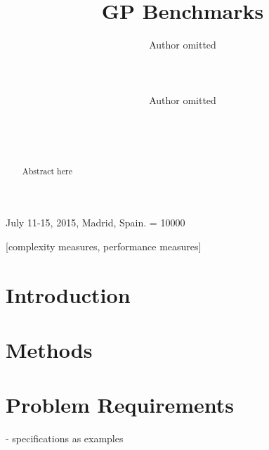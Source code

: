 \documentclass{sig-alternate}
\begin{document}
%
 {July 11-15, 2015, Madrid, Spain.}
\widowpenalty = 10000

\title{GP Benchmarks}


\author{
\alignauthor
Author omitted\\
       \\
       \\
       \\
\alignauthor
Author omitted\\
       \\
       \\
       \\
}

\maketitle

\begin{abstract}
Abstract here
\end{abstract}

[complexity measures, performance measures]



\section{Introduction}



\section{Methods}


\section{Problem Requirements}

- specifications as examples
\end{document}
